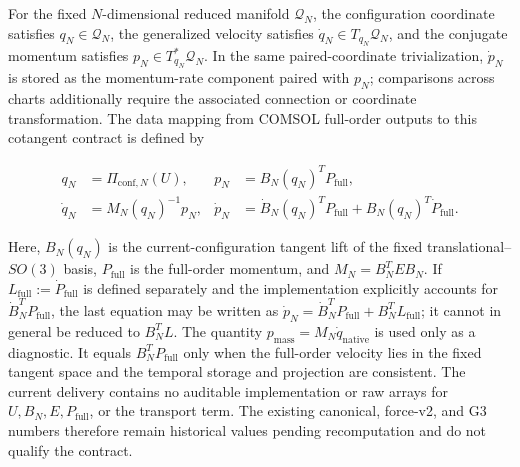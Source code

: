 For the fixed \(N\)-dimensional reduced manifold \(\mathcal{Q}_{N}\), the configuration coordinate satisfies \(q_N\in\mathcal{Q}_{N}\), the generalized velocity satisfies \(\dot q_N\in T_{q_N}\mathcal{Q}_{N}\), and the conjugate momentum satisfies \(p_N\in T_{q_N}^{*}\mathcal{Q}_{N}\). In the same paired-coordinate trivialization, \(\dot p_N\) is stored as the momentum-rate component paired with \(p_N\); comparisons across charts additionally require the associated connection or coordinate transformation. The data mapping from COMSOL full-order outputs to this cotangent contract is defined by

\begin{equation}
\label{eq:hamiltonian-canonical-data-contract}
\boxed{\begin{aligned}
q_N&=\Pi_{\mathrm{conf},N}(U),&
p_N&=B_N(q_N)^{T}P_{\mathrm{full}},\\
\dot q_N&=M_N(q_N)^{-1}p_N,&
\dot p_N&=\dot B_N(q_N)^{T}P_{\mathrm{full}}+B_N(q_N)^{T}\dot P_{\mathrm{full}}.
\end{aligned}}
\end{equation}

Here, \(B_N(q_N)\) is the current-configuration tangent lift of the fixed translational--\(SO(3)\) basis, \(P_{\mathrm{full}}\) is the full-order momentum, and \(M_N=B_N^{T}EB_N\). If \(L_{\mathrm{full}}:=\dot P_{\mathrm{full}}\) is defined separately and the implementation explicitly accounts for \(\dot B_N^{T}P_{\mathrm{full}}\), the last equation may be written as \(\dot p_N=\dot B_N^{T}P_{\mathrm{full}}+B_N^{T}L_{\mathrm{full}}\); it cannot in general be reduced to \(B_N^{T}L\). The quantity \(p_{\mathrm{mass}}=M_N\dot q_{\mathrm{native}}\) is used only as a diagnostic. It equals \(B_N^{T}P_{\mathrm{full}}\) only when the full-order velocity lies in the fixed tangent space and the temporal storage and projection are consistent. The current delivery contains no auditable implementation or raw arrays for \(U,B_N,E,P_{\mathrm{full}}\), or the transport term. The existing canonical, force-v2, and G3 numbers therefore remain historical values pending recomputation and do not qualify the contract.

